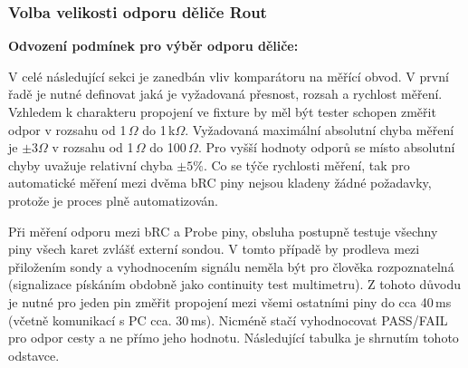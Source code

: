\subsubsection{Volba velikosti odporu děliče Rout}
\textbf{Odvození podmínek pro výběr odporu děliče:}\par
V celé následující sekci je zanedbán vliv komparátoru na měřící obvod.
V první řadě je nutné definovat jaká je vyžadovaná přesnost, rozsah a rychlost měření.
Vzhledem k charakteru propojení ve fixture by měl být tester schopen změřit odpor v rozsahu od 1\,$\Omega$ do 1\,k$\Omega$.
Vyžadovaná maximální absolutní chyba měření je $\pm 3\Omega$ v rozsahu od 1\,$\Omega$ do 100\,$\Omega$. Pro vyšší hodnoty odporů
se místo absolutní chyby uvažuje relativní chyba $\pm 5\%$.
Co se týče rychlosti měření, tak pro automatické měření mezi dvěma bRC piny nejsou kladeny žádné požadavky,
protože je proces plně automatizován.\par
Při měření odporu mezi bRC a Probe piny, obsluha postupně testuje všechny piny všech karet zvlášť externí sondou.
V tomto případě by prodleva mezi přiložením sondy a vyhodnocením signálu neměla být pro
člověka rozpoznatelná (signalizace pískáním obdobně jako continuity test multimetru).
Z tohoto důvodu je nutné pro jeden pin změřit propojení mezi všemi ostatními piny
do cca 40\,ms (včetně komunikací s PC cca. 30\,ms).
Nicméně stačí vyhodnocovat PASS/FAIL pro odpor cesty a ne přímo jeho hodnotu.
Následující tabulka je shrnutím tohoto odstavce.\par


